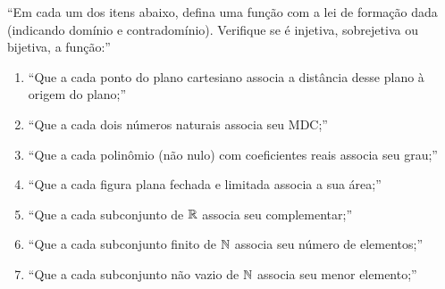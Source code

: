 \enquote{Em cada um dos itens abaixo, defina uma função com a lei de formação dada (indicando domínio e contradomínio). Verifique se é injetiva, sobrejetiva ou bijetiva, a função:}
\begin{enumerate}
    \item \enquote{Que a cada ponto do plano cartesiano associa a distância desse plano à origem do plano;} 
    \\  
    \item \enquote{Que a cada dois números naturais associa seu MDC;} 
    \\  
    \item \enquote{Que a cada polinômio (não nulo) com coeficientes reais associa seu grau;} 
    \\  
    \item \enquote{Que a cada figura plana fechada e limitada associa a sua área;} 
    \\  
    \item \enquote{Que a cada subconjunto de $\mathbb R$ associa seu complementar;} 
    \\  
    \item \enquote{Que a cada subconjunto finito de $\mathbb N$ associa seu número de elementos;} 
    \\  
    \item \enquote{Que a cada subconjunto não vazio de $\mathbb N$ associa seu menor elemento;} 
    \\  
\end{enumerate}